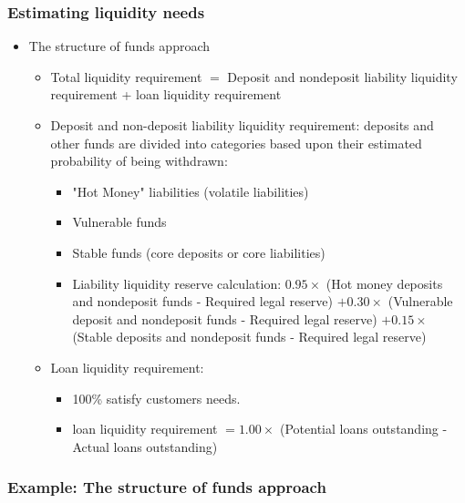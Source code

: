   \subsubsection{Estimating liquidity needs}
  \begin{itemize}
    \item The structure of funds approach
        \begin{itemize}
            \item Total liquidity requirement \(=\) Deposit and nondeposit liability liquidity requirement + loan liquidity requirement 
            \item Deposit and non-deposit liability liquidity requirement: deposits and other funds are divided into categories based upon their estimated probability of being withdrawn:
            \begin{itemize}
                \item "Hot Money" liabilities (volatile liabilities)
                \item Vulnerable funds
                \item Stable funds (core deposits or core liabilities)
                \item Liability liquidity reserve calculation:  \(0.95 \times\) (Hot money deposits and nondeposit funds - Required legal reserve) \(+ 0.30 \times\) (Vulnerable deposit and nondeposit funds - Required legal reserve) \(+ 0.15 \times\) (Stable deposits and nondeposit funds - Required legal reserve)
            \end{itemize}
            \item Loan liquidity requirement:
            \begin{itemize}
              \item 100\% satisfy customers needs.
              \item loan liquidity requirement \(= 1.00 \times\) (Potential loans outstanding - Actual loans outstanding)
            \end{itemize}

        \end{itemize}
    
       
      \end{itemize}

  
  







\subsubsection{Example: The structure of funds approach}

